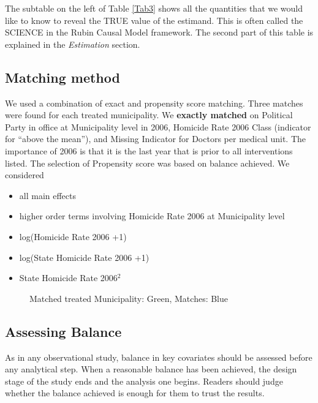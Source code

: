 \documentclass{article}[11 pt]
\begin{document}
The subtable on the left of Table \ref{Tab3} shows all the quantities that we would like to know to reveal the TRUE value of the estimand. This is often called the SCIENCE in the Rubin Causal Model framework. The second part of this table is explained in the \emph{Estimation} section.					

\subsection{Matching method}
We used a combination of exact and propensity score matching. Three matches were found for each treated municipality. We \textbf{exactly matched} on Political Party in office at Municipality level in 2006, Homicide Rate 2006 Class (indicator for ``above the mean''), and Missing Indicator for Doctors per medical unit. The importance of 2006 is that it is the last year that is prior to all interventions listed. The selection of Propensity score was based on balance achieved. We considered
\begin{itemize}
	 \item all main effects
	\item higher order terms involving Homicide Rate 2006 at Municipality level
	\item log(Homicide Rate 2006 +1)
	\item log(State Homicide Rate 2006 +1)
	\item State Homicide Rate 2006$^2$
\end{itemize}

 

\begin{figure}[htdp]
    \centering
{}
	\hspace{2cm}
\caption{Matched treated Municipality: Green, Matches: Blue}
\label{FigMatches}	
\end{figure}	


\subsection{Assessing Balance}
As in any observational study, balance in key covariates should be assessed before any analytical step. When a reasonable balance has been achieved, the design stage of the study ends and the analysis one begins. Readers should judge whether the balance achieved is enough for them to trust the results.  
\end{document}
